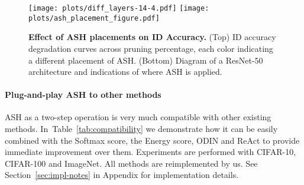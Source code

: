 \documentclass{article}
\newcommand{\figlabel}[1]{\label{fig:#1}}
\newcommand{\secref}[1]{Section~\ref{sec:#1}}
\newcommand{\tabref}[1]{Table~\ref{tab:#1}}
\begin{document}
\begin{figure}[hbt!]
    \centering 
  	\texttt{[image: plots/diff\_layers-14-4.pdf]}
\texttt{[image: plots/ash\_placement\_figure.pdf]}
	\caption{\textbf{Effect of ASH placements on ID Accuracy.} (Top) ID accuracy degradation curves across pruning percentage, each color indicating a different placement of ASH. (Bottom) Diagram of a ResNet-50 architecture and indications of where ASH is applied. }
	\figlabel{diff_layers}
\end{figure}

\paragraph{Plug-and-play ASH to other methods}
ASH as a two-step operation is very much compatible with other existing methods. In~\tabref{compatibility} we demonstrate how it can be easily combined with the Softmax score, the Energy score, ODIN and ReAct to provide immediate improvement over them. Experiments are performed with CIFAR-10, CIFAR-100 and ImageNet. All methods are reimplemented by us. See \secref{impl-notes} in Appendix for implementation details. 
\end{document}
